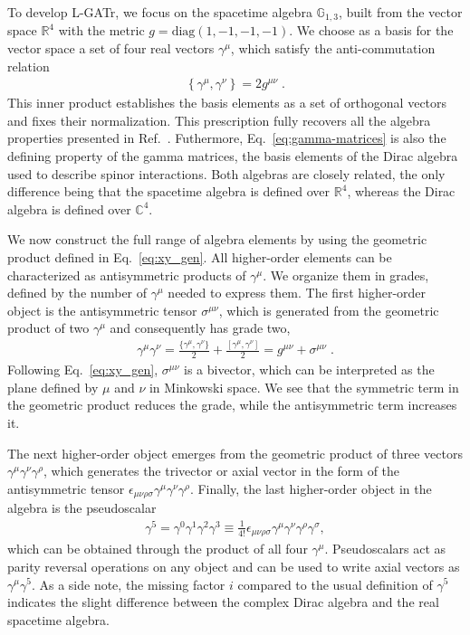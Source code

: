 \documentclass[submission, Phys]{SciPost}
\begin{document}
To develop L-GATr, we focus on the spacetime algebra $\mathbb{G}_{1,3}$, built from the vector space $\mathbb{R}^{4}$ with the metric $g=\text{diag}(1,-1,-1,-1)$. We choose as a basis for the vector space a set of four real vectors $\gamma^\mu$, which satisfy the anti-commutation relation
%
\begin{align}
    \left\{\gamma^{\mu}, \gamma^{\nu} \right\} = 2 g^{\mu\nu} \; .
    \label{eq:gamma-matrices}
\end{align}
%
This inner product establishes the basis elements as a set of orthogonal vectors and fixes their normalization. This prescription fully recovers all the algebra properties presented in Ref.~\cite{Spinner:2024hjm}. Futhermore, Eq.~\eqref{eq:gamma-matrices} is also the defining property of the gamma matrices, the basis elements of the Dirac algebra used to describe spinor interactions. Both algebras are closely related, the only difference being that the spacetime algebra is defined over $\mathbb{R}^4$, whereas the Dirac algebra is defined over $\mathbb{C}^4$.

We now construct the full range of algebra elements by using the geometric product defined in Eq.~\eqref{eq:xy_gen}. All higher-order elements can be characterized as antisymmetric products of $\gamma^{\mu}$. We organize them in grades, defined by the number of $\gamma^\mu$ needed to express them. The first higher-order object is  the antisymmetric tensor $\sigma^{\mu\nu}$, which is generated from the geometric product of two $\gamma^\mu$ and consequently has grade two,
%
\begin{align}
    \gamma^{\mu} \gamma^{\nu} 
    = \frac{\{ \gamma^\mu, \gamma^\nu \}}{2} + \frac{[ \gamma^\mu, \gamma^\nu]}{2} 
    = g^{\mu\nu} + \sigma^{\mu \nu}  \; .
\end{align}
%
Following Eq.~\eqref{eq:xy_gen}, $\sigma^{\mu\nu}$ is a bivector, which can be interpreted as the plane defined by $\mu$ and $\nu$ in Minkowski space. We see that the symmetric term in the geometric product reduces the grade, while the antisymmetric term increases it.

The next higher-order object emerges from the geometric product of three vectors $\gamma^\mu \gamma^\nu \gamma^\rho$, which generates the trivector or axial vector in the form of the antisymmetric tensor $\epsilon_{\mu\nu\rho\sigma}\gamma^{\mu}\gamma^{\nu}\gamma^{\rho}$. Finally, the last higher-order object in the algebra is the pseudoscalar
%
\begin{align}
    \gamma^5
    =\gamma^0\gamma^1\gamma^2\gamma^3 
    \equiv \frac{1}{4!}\epsilon_{\mu\nu\rho\sigma}\gamma^\mu\gamma^\nu\gamma^\rho\gamma^\sigma,
\end{align}
%
which can be obtained through the product of all four $\gamma^\mu$. Pseudoscalars act as parity reversal operations on any object and can be used to write axial vectors as $\gamma^\mu\gamma^5$. As a side note, the missing factor $i$ compared to the usual definition of $\gamma^5$ indicates the slight difference between the complex Dirac algebra and the real spacetime algebra.
\end{document}
